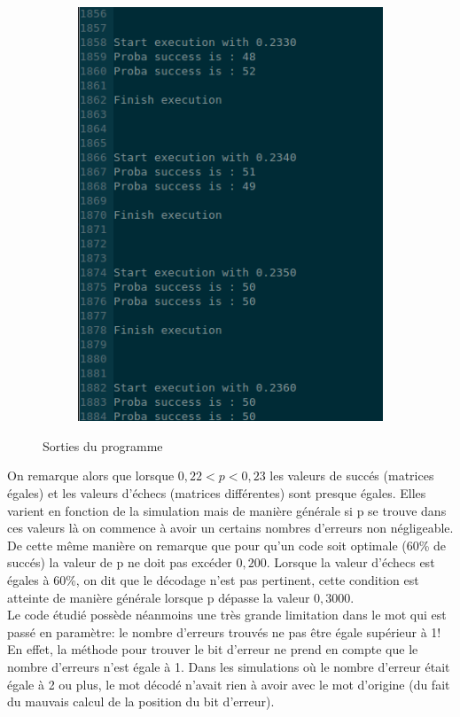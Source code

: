 \begin{figure}
\begin{subfigure}[b]{0.3\textwidth}
        \includegraphics[width=\textwidth]{img/code3.png}
        \label{fig:mouse}
    \end{subfigure}
    \caption{Sorties du programme}\label{fig:animals}
\end{figure}
On remarque alors que lorsque $0,22 < p < 0,23$ les valeurs de succés (matrices égales) et les valeurs d'échecs (matrices différentes) sont presque égales. Elles varient en fonction de la simulation mais de manière générale si p se trouve dans ces valeurs là on commence à avoir un certains nombres d'erreurs non négligeable.
De cette même manière on remarque que pour qu'un code soit optimale (60\% de succés) la valeur de p ne doit pas excéder $0,200$. Lorsque la valeur d'échecs est égales à 60\%, on dit que le décodage n'est pas pertinent, cette condition est atteinte de manière générale lorsque p dépasse la valeur $0,3000$.\\
Le code étudié possède néanmoins une très grande limitation dans le mot qui est passé en paramètre: le nombre d'erreurs trouvés ne pas être égale supérieur à 1! En effet, la méthode pour trouver le bit d'erreur ne prend en compte que le nombre d'erreurs n'est égale à 1. Dans les simulations où le nombre d'erreur était égale à 2 ou plus, le mot décodé n'avait rien à avoir avec le mot d'origine (du fait du mauvais calcul de la position du bit d'erreur).